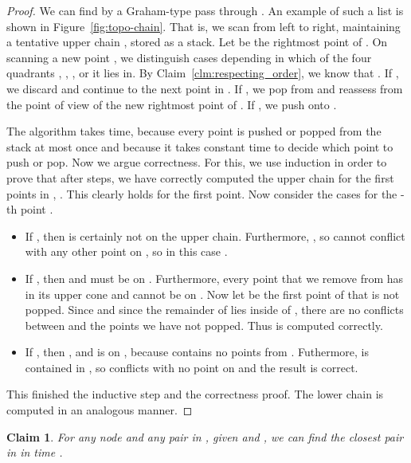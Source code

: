 \documentclass[11pt]{paper}
\newtheorem {claim}[theorem] {Claim}
\begin{document}
\begin{proof}
We can find  by a Graham-type pass through .
An example of such a list is shown in Figure~\ref {fig:topo-chain}.
That is, we scan  from left to right, 
maintaining
a tentative upper chain , stored as a stack. 
Let  be the rightmost point of .
On scanning a new point , we distinguish cases depending
in which of the four quadrants
, , 
, or 
it lies in.
By Claim~\ref {clm:respecting_order}, we know that 
. 
If , we discard  and continue to
the next point in . 
If , we
pop  from  and reassess  from the point of view of the
new rightmost point of .
If , we push  onto .

The algorithm takes  time, because every point is pushed
or popped from the stack at most once and because it takes constant
time to decide which point to push or pop.
Now we argue correctness. For this, we use induction in order to
prove that after  steps, we have correctly computed the
upper chain for the first  points in , . This clearly
holds for the first point. Now consider the cases for the -th
point . 
\begin{itemize}
\item
If , then  is certainly
not on the upper chain. Furthermore, 
,
so  cannot conflict with any other point on ,
so in this case .
\item
If , then 
 and 
must be on . Furthermore, every point that we remove
from  has  in its upper cone and cannot be on
. Now let  be the first point of  that
is not popped. Since 
 and since
the remainder of  lies inside of 
, there are no conflicts between  and the
points we have not popped. Thus  is computed correctly.
\item If , then 
, and  is on , because
 contains no points from .
Futhermore,  is contained in ,
so  conflicts with no point on  and the result is correct.
\end{itemize}
This finished the inductive step and the correctness proof.
The lower chain is computed in an analogous manner.
\end{proof}

\begin{claim}\label{clm:find_closest}
For any node  and any pair  in , given
 and , we can find the closest pair in 
in time .
\end{claim}
\end{document}
